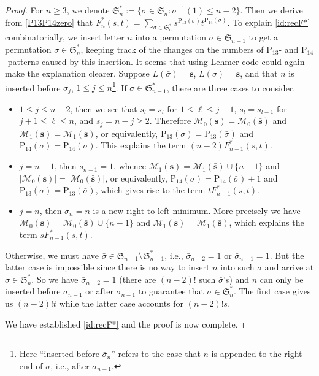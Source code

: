 \documentclass[12pt,reqno]{article}
\numberwithin{equation}{section}
\theoremstyle{plain}
\theoremstyle{definition}
\def\fS{\mathfrak{S}}
\def\rP{\mathrm{P}}
\def\cN{\mathcal{M}}
\def\bs{\mathbf{s}}
\begin{document}
\begin{proof}
For $n\ge 3$, we denote $\fS_n^*:=\{\sigma\in\fS_n: \sigma^{-1}(1)\le n-2\}$. Then we derive from \eqref{P13P14zero} that $F_n^*(s,t)=\sum_{\sigma\in\fS_n^*}s^{\rP_{13}(\sigma)}t^{\rP_{14}(\sigma)}$. To explain \eqref{id:recF*} combinatorially, we insert letter $n$ into a permutation $\bar{\sigma}\in\fS_{n-1}$ to get a permutation $\sigma\in\fS_n^*$, keeping track of the changes on the numbers of $\rP_{13}$- and $\rP_{14}$-patterns caused by this insertion. It seems that using Lehmer code could again make the explanation clearer. Suppose $L(\bar{\sigma})=\bar{\bs}$, $L(\sigma)=\bs$, and that $n$ is inserted before $\bar{\sigma}_j$, $1\le j\le n$\footnote{Here ``inserted before $\bar{\sigma}_n$'' refers to the case that $n$ is appended to the right end of $\bar{\sigma}$, i.e., after $\bar{\sigma}_{n-1}$.}. If $\bar{\sigma}\in\fS_{n-1}^*$, there are three cases to consider. 
\begin{itemize}
	\item $1\le j\le n-2$, then we see that $s_l=\bar{s}_l$ for $1\le \ell\le j-1$, $s_l=\bar{s}_{l-1}$ for $j+1\le \ell\le n$, and $s_j=n-j\ge 2$. Therefore $\cN_0(\bs)=\cN_0(\bar{\bs})$ and $\cN_1(\bs)=\cN_1(\bar{\bs})$, or equivalently, $\rP_{13}(\sigma)=\rP_{13}(\bar{\sigma})$ and $\rP_{14}(\sigma)=\rP_{14}(\bar{\sigma})$. This explains the term $(n-2)F_{n-1}^*(s,t)$.
	\item $j=n-1$, then $s_{n-1}=1$, whence $\cN_1(\bs)=\cN_1(\bar{\bs})\cup\{n-1\}$ and $|\cN_0(\bs)|=|\cN_0(\bar{\bs})|$, or equivalently, $\rP_{14}(\sigma)=\rP_{14}(\bar{\sigma})+1$ and $\rP_{13}(\sigma)=\rP_{13}(\bar{\sigma})$, which gives rise to the term $tF_{n-1}^*(s,t)$.
	\item $j=n$, then $\sigma_n=n$ is a new right-to-left minimum. More precisely we have $\cN_0(\bs)=\cN_0(\bar{\bs})\cup\{n-1\}$ and $\cN_1(\bs)=\cN_1(\bar{\bs})$, which explains the term $sF_{n-1}^*(s,t)$.
\end{itemize}
Otherwise, we must have $\bar{\sigma}\in\fS_{n-1}\setminus\fS_{n-1}^*$, i.e., $\bar{\sigma}_{n-2}=1$ or $\bar{\sigma}_{n-1}=1$. But the latter case is impossible since there is no way to insert $n$ into such $\bar{\sigma}$ and arrive at $\sigma\in\fS_n^*$. So we have $\bar{\sigma}_{n-2}=1$ (there are $(n-2)!$ such $\bar{\sigma}$'s) and $n$ can only be inserted before $\bar{\sigma}_{n-1}$ or after $\bar{\sigma}_{n-1}$ to guarantee that $\sigma\in\fS_n^*$. The first case gives us $(n-2)!t$ while the latter case accounts for $(n-2)!s$.

We have established \eqref{id:recF*} and the proof is now complete.
\end{proof}
\end{document}
